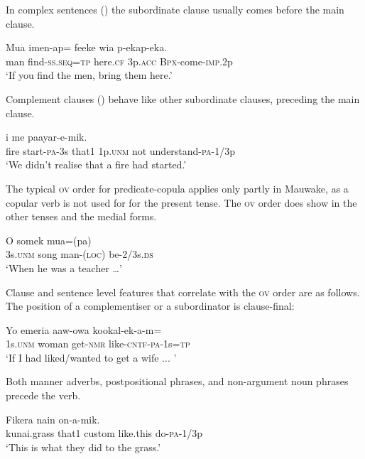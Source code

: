 In complex sentences () the subordinate clause usually comes before the main clause.

\ea%
\label{ex:1:x674}
\gll Mua  imen-ap=  feeke  wia  p-ekap-eka. \\
 man  find-\textsc{ss}.\textsc{seq}=\textsc{tp}  here.\textsc{cf}  3p.\textsc{acc}  \textsc{Bpx}-come-\textsc{imp}.2p     \\
\glt`If you find the men, bring them here.'
\z


Complement clauses () behave like other subordinate clauses, preceding the main clause. 

\ea%
\label{ex:1:x675}
\gll {}     i  me  paayar-e-mik. \\
fire  start-\textsc{pa}-3s  that1  1p.\textsc{unm}  not  understand-\textsc{pa}-1/3p      \\
\glt`We didn't realise that a fire had started.'
\z


The typical \textsc{ov} order for predicate-copula applies only partly in Mauwake, as a copular verb is not used for for the present tense. The \textsc{ov} order does show in the other tenses and the medial forms.

\ea%
\label{ex:1:x676}
\gll O  somek  mua=(pa)   \\
3s.\textsc{unm}  song  man-(\textsc{loc})  be-2/3s.\textsc{ds}      \\
\glt`When he was a teacher {\dots}'
\z


Clause and sentence level features that correlate with the \textsc{ov} order are as follows. The position of a complementiser or a subordinator is clause-final:

\ea%
\label{ex:1:x677}
\gll Yo  emeria  aaw-owa  kookal-ek-a-m= \\
 1s.\textsc{unm}  woman  get-\textsc{nmr}  like-\textsc{cntf}-\textsc{pa}-1s=\textsc{tp} \\
\glt`If I had liked/wanted to get a wife ...  '
\z


Both manner adverbs, postpositional phrases, and non-argument noun phrases precede the verb.

\ea%
\label{ex:1:x678}
\gll Fikera  nain     on-a-mik. \\
  kunai.grass  that1  custom  like.this  do-\textsc{pa}-1/3p    \\
\glt `This is what they did to the  grass.'
\z


